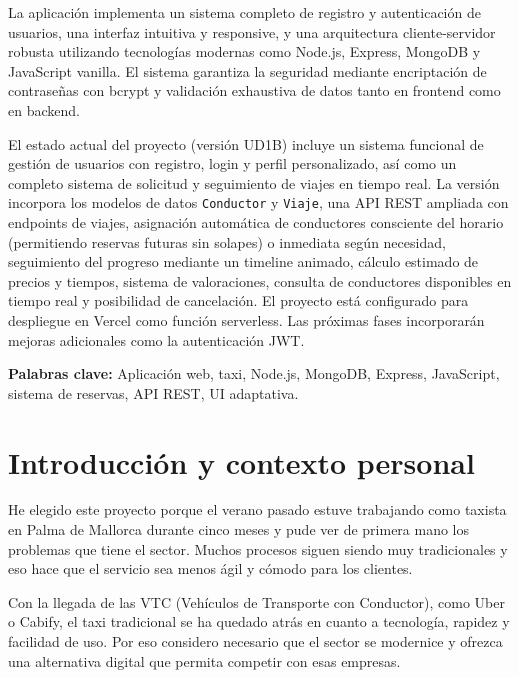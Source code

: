 \documentclass[12pt,a4paper]{article}
\begin{document}
La aplicación implementa un sistema completo de registro y autenticación de usuarios, una interfaz intuitiva y responsive, y una arquitectura cliente-servidor robusta utilizando tecnologías modernas como Node.js, Express, MongoDB y JavaScript vanilla. El sistema garantiza la seguridad mediante encriptación de contraseñas con bcrypt y validación exhaustiva de datos tanto en frontend como en backend.

El estado actual del proyecto (versión UD1B) incluye un sistema funcional de gestión de usuarios con registro, login y perfil personalizado, así como un completo sistema de solicitud y seguimiento de viajes en tiempo real. La versión incorpora los modelos de datos \texttt{Conductor} y \texttt{Viaje}, una API REST ampliada con endpoints de viajes, asignación automática de conductores consciente del horario (permitiendo reservas futuras sin solapes) o inmediata según necesidad, seguimiento del progreso mediante un timeline animado, cálculo estimado de precios y tiempos, sistema de valoraciones, consulta de conductores disponibles en tiempo real y posibilidad de cancelación. El proyecto está configurado para despliegue en Vercel como función serverless. Las próximas fases incorporarán mejoras adicionales como la autenticación JWT.

\textbf{Palabras clave:} Aplicación web, taxi, Node.js, MongoDB, Express, JavaScript, sistema de reservas, API REST, UI adaptativa.

\newpage

\section{Introducción y contexto personal}

He elegido este proyecto porque el verano pasado estuve trabajando como taxista en Palma de Mallorca durante cinco meses y pude ver de primera mano los problemas que tiene el sector. Muchos procesos siguen siendo muy tradicionales y eso hace que el servicio sea menos ágil y cómodo para los clientes.

Con la llegada de las VTC (Vehículos de Transporte con Conductor), como Uber o Cabify, el taxi tradicional se ha quedado atrás en cuanto a tecnología, rapidez y facilidad de uso. Por eso considero necesario que el sector se modernice y ofrezca una alternativa digital que permita competir con esas empresas. 
\end{document}
